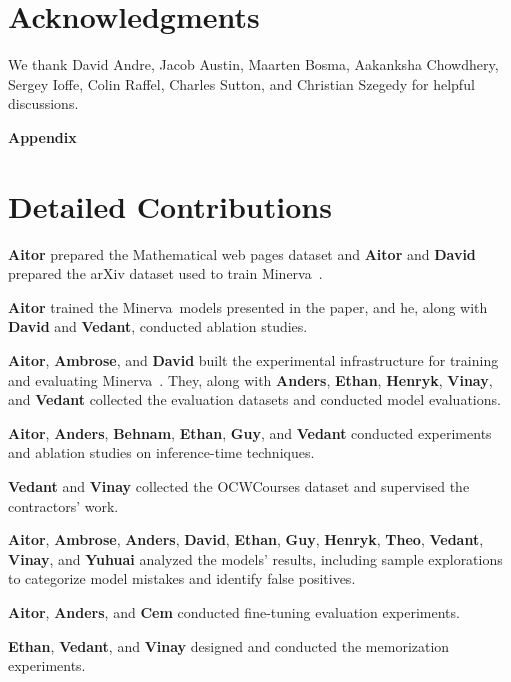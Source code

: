 \documentclass{article}
\newcommand{\ourmodel}[0]{{Minerva~}}
\begin{document}
\section{Acknowledgments}
We thank David Andre, Jacob Austin, Maarten Bosma, Aakanksha Chowdhery, Sergey Ioffe, Colin Raffel, Charles Sutton, and Christian Szegedy for helpful discussions.




\newpage
\begin{center}
\textbf{\huge Appendix}
\end{center}
\appendix

\section{Detailed Contributions}

\textbf{Aitor} prepared the Mathematical web pages dataset and \textbf{Aitor} and \textbf{David} prepared the arXiv dataset used to train \ourmodel\!\!.

\textbf{Aitor} trained the \ourmodel models presented in the paper, and he, along with \textbf{David} and \textbf{Vedant}, conducted ablation studies.

\textbf{Aitor}, \textbf{Ambrose}, and \textbf{David} built the experimental infrastructure for training and evaluating \ourmodel\!. They, along with \textbf{Anders}, \textbf{Ethan}, \textbf{Henryk}, \textbf{Vinay}, and \textbf{Vedant} collected the evaluation datasets and conducted model evaluations.

\textbf{Aitor}, \textbf{Anders}, \textbf{Behnam}, \textbf{Ethan}, \textbf{Guy}, and \textbf{Vedant} conducted experiments and ablation studies on inference-time techniques.

\textbf{Vedant} and \textbf{Vinay} collected the OCWCourses dataset and supervised the contractors' work.

\textbf{Aitor}, \textbf{Ambrose}, \textbf{Anders}, \textbf{David}, \textbf{Ethan}, \textbf{Guy}, \textbf{Henryk}, \textbf{Theo}, \textbf{Vedant}, \textbf{Vinay}, and \textbf{Yuhuai} analyzed the models' results, including sample explorations to categorize model mistakes and identify false positives.

\textbf{Aitor}, \textbf{Anders}, and \textbf{Cem} conducted fine-tuning evaluation experiments.

\textbf{Ethan}, \textbf{Vedant}, and \textbf{Vinay} designed and conducted the memorization experiments.
\end{document}
